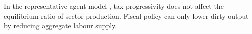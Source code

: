 	\begin{comment}
	To see this write:
\begin{align}
	\frac{d\left(\frac{Y_d}{Y_c}\right)}{d \tau_l}=\frac{Y_d}{Y_c}\left(\frac{\frac{dY_d}{Y_d}}{d \tau_l}-\frac{\frac{dY_c}{Y_c}}{d \tau_l}\right)=0
\end{align}
and observe that the percentage change in sector output is homogeneous. 
\begin{align}
	\frac{1}{Y_d}\frac{dY_d}{d \tau_l}= \frac{1}{L_d}\frac{d L_d}{d \tau_l}=\frac{1}{H}\frac{d H}{d \tau_l}\ \text{and} \ \frac{1}{Y_c}\frac{dY_c}{d \tau_l}= \frac{1}{L_c}\frac{d L_c}{d \tau_l}=\frac{1}{H}\frac{d H}{d \tau_l}.
\end{align}
\textbf{}
content...
\end{comment}

\begin{prop}
	In the representative agent model , tax progressivity does not affect the equilibrium ratio of sector production. Fiscal policy can only lower dirty output by reducing aggregate labour supply.
\end{prop}

